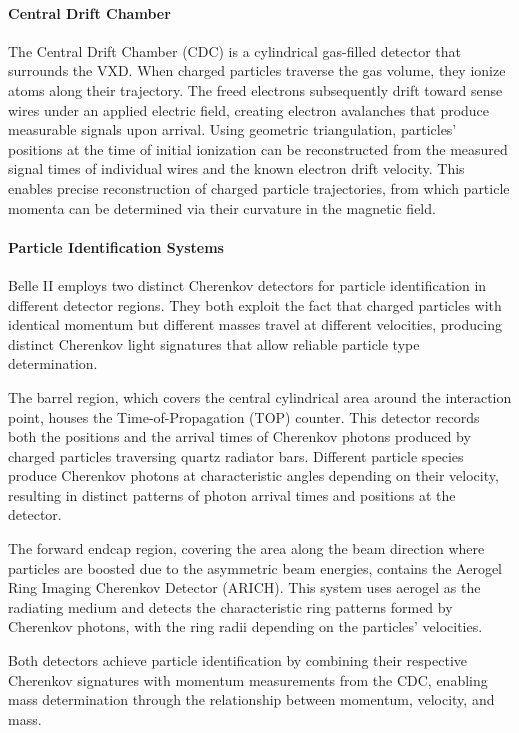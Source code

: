 \paragraph{Central Drift Chamber}
The Central Drift Chamber (CDC) is a cylindrical gas-filled detector that surrounds the VXD.
When charged particles traverse the gas volume, they ionize atoms along their trajectory.
The freed electrons subsequently drift toward sense wires under an applied electric field, creating electron avalanches that produce measurable signals upon arrival.
Using geometric triangulation, particles' positions at the time of initial ionization can be reconstructed from the measured signal times of individual wires and the known electron drift velocity.
This enables precise reconstruction of charged particle trajectories, from which particle momenta can be determined via their curvature in the magnetic field.

\paragraph{Particle Identification Systems}
Belle II employs two distinct Cherenkov detectors for particle identification in different detector regions.
They both exploit the fact that charged particles with identical momentum but different masses travel at different velocities, producing distinct Cherenkov light signatures that allow reliable particle type determination.

The barrel region, which covers the central cylindrical area around the interaction point, houses the Time-of-Propagation (TOP) counter.
This detector records both the positions and the arrival times of Cherenkov photons produced by charged particles traversing quartz radiator bars.
Different particle species produce Cherenkov photons at characteristic angles depending on their velocity, resulting in distinct patterns of photon arrival times and positions at the detector.

The forward endcap region, covering the area along the beam direction where particles are boosted due to the asymmetric beam energies, contains the Aerogel Ring Imaging Cherenkov Detector (ARICH).
This system uses aerogel as the radiating medium and detects the characteristic ring patterns formed by Cherenkov photons, with the ring radii depending on the particles' velocities.

Both detectors achieve particle identification by combining their respective Cherenkov signatures with momentum measurements from the CDC, enabling mass determination through the relationship between momentum, velocity, and mass.

